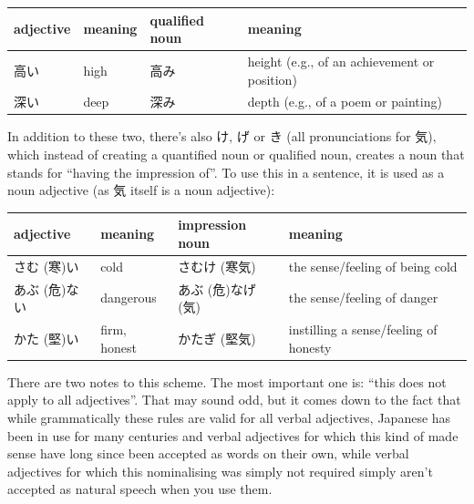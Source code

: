 \documentclass[11pt, b5paper, twoside, openright, onecolumn]{book}
\makeatletter
\newcommand*{\rtrubystack}[2]{{\relscale{0.5}%
  \begin{tabular}[b]{@{}c@{}}%
    {#1}\\%
    {\textscale{2}{#2}}%
  \end{tabular}}%
}
\DeclareRobustCommand*{\rtruby}[2]{%
  \mbox{%
    \setlength{\parskip}{0ex}%
    \BeginAccSupp{method=pdfstringdef,ActualText={#1}}%
      \rtrubystack{\phantom{#2}}{#1}%
      \llap{%
        \rtrubystack{#2}{\phantom{#1}}%
      }%
    \EndAccSupp{}%
  }%
}
\renewcommand*{\rtruby}[2]{#2 (#1)}%
\newenvironment{mytabularcentered}[1]{\noindent
\begin{center}\begin{tabular}[h]{#1}}{\end{tabular}\end{center}}
\makeatother
\begin{document}
\smaller
\begin{center}
\begin{mytabularcentered}{| l  l  l  l |}\hline 
\rule{0pt}{2.4ex}adjective & meaning & \index[english]{Noun forms!qualified noun}qualified noun & meaning\\ 
\hline
\rule{0pt}{2.4ex}高い & high & 高み & height (e.g.‚ of an achievement or position)\\ 
\rule{0pt}{2.4ex}深い & deep & 深み & depth (e.g.‚ of a poem or painting)\\ 
\hline 
\end{mytabularcentered}
\end{center}
\larger
\vspace{0.5cm}


In addition to these two‚ there’s also け‚ げ or き (all pronunciations for 気)‚ which instead of creating a quantified noun or qualified noun‚ creates a noun that stands for “having the impression of”. To use this in a sentence‚ it is used as a noun adjective (as 気 itself is a noun adjective):

\vspace{0.5cm}
\smaller
\begin{center}
\begin{mytabularcentered}{| l  l  l  l |}\hline 
\rule{0pt}{2.4ex}adjective & meaning & impression noun & meaning\\ 
\hline
\rule{0pt}{3.6ex}\rtruby{寒}{さむ}い & cold & \rtruby{寒気}{さむけ} & the sense/feeling of being cold\\ 
\rule{0pt}{3.6ex}\rtruby{危}{あぶ}ない & dangerous & \rtruby{危}{あぶ}な\rtruby{気}{げ} & the sense/feeling of danger\\ 
\rule{0pt}{3.6ex}\rtruby{堅}{かた}い & firm‚ honest & \rtruby{堅気}{かたぎ} & instilling a sense/feeling of honesty\\ 
\hline 
\end{mytabularcentered}
\end{center}
\larger
\vspace{0.5cm}


There are two notes to this scheme. The most important one is: “this does not apply to all adjectives”. That may sound odd‚ but it comes down to the fact that while grammatically these rules are valid for all verbal adjectives‚ Japanese has been in use for many centuries and verbal adjectives for which this kind of  made sense have long since been accepted as words on their own‚ while verbal adjectives for which this nominalising was simply not required simply aren’t accepted as natural speech when you use them.
\end{document}
